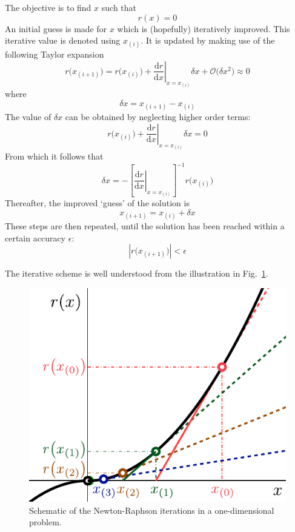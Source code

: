 \documentclass[times,namecite]{goose-article}
\begin{document}
The objective is to find $x$ such that
\begin{equation}
  r(x) = 0
\end{equation}
An initial guess is made for $x$ which is (hopefully) iteratively improved. This iterative value is denoted using $x_{(i)}$. It is updated by making use of the following Taylor expansion
\begin{equation}
  r \big( x_{(i+1)} \big)
  =
  r \big( x_{(i)} \big)
  +
  \left. \frac{\mathrm{d} r}{\mathrm{d} x} \right|_{x = x_{(i)}} \delta x
  +
  \mathcal{O} \big( \delta x^2 \big)
  \approx
  0
\end{equation}
where
\begin{equation}
  \delta x = x_{(i+1)} - x_{(i)}
\end{equation}
The value of $\delta x$ can be obtained by neglecting higher order terms:
\begin{equation}
  r \big( x_{(i)} \big)
  +
  \left. \frac{\mathrm{d} r}{\mathrm{d} x} \right|_{x = x_{(i)}} \delta x
  =
  0
\end{equation}
From which it follows that
\begin{equation}
  \delta x
  =
  - \left[ \left. \frac{\mathrm{d} r}{\mathrm{d} x} \right|_{x = x_{(i)}} \right]^{-1}
  r \big( x_{(i)} \big)
\end{equation}
Thereafter, the improved `guess' of the solution is
\begin{equation}
  x_{(i+1)} = x_{(i)} + \delta x
\end{equation}
These steps are then repeated, until the solution has been reached within a certain accuracy $\epsilon$:
\begin{equation}
  \left| r \big( x_{(i+1)} \big) \right| < \epsilon
\end{equation}

The iterative scheme is well understood from the illustration in Fig.~\ref{fig:newton-raphson}.

\begin{figure}[htp]
  \centering
  \includegraphics[width=.3\textwidth]{figures/newton-raphson.pdf}
  \caption{Schematic of the Newton-Raphson iterations in a one-dimensional problem.}
  \label{fig:newton-raphson}
\end{figure}
\end{document}
